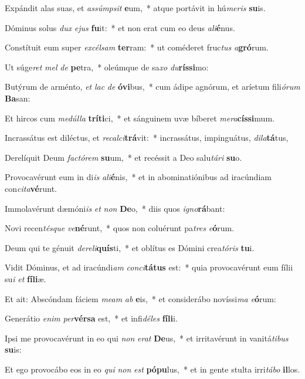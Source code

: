 \item Expándit alas suas, et \textit{as}\textit{súmp}\textit{sit} \textbf{e}um,~* atque portávit in hú\textit{me}\textit{ris} \textbf{su}is.
\item Dóminus solus \textit{dux} \textit{e}\textit{jus} \textbf{fu}it:~* et non erat cum eo deus \textit{a}\textit{li}\textbf{é}nus.
\item Constítuit eum super \textit{ex}\textit{cél}\textit{sam} \textbf{ter}ram:~* ut coméderet fruc\textit{tus} \textit{a}\textbf{gró}rum.
\item Ut súge\textit{ret} \textit{mel} \textit{de} \textbf{pe}tra,~* oleúmque de sa\textit{xo} \textit{du}\textbf{rís}\textbf{si}mo:
\item Butýrum de arménto, \textit{et} \textit{lac} \textit{de} \textbf{ó}\textbf{vi}bus,~* cum ádipe agnórum, et aríetum fili\textit{ó}\textit{rum} \textbf{Ba}san:
\item Et hircos cum \textit{me}\textit{dúl}\textit{la} \textbf{trí}\textbf{ti}ci,~* et sánguinem uvæ bíberet \textit{me}\textit{ra}\textbf{cís}\textbf{si}mum.
\item Incrassátus est diléctus, et \textit{re}\textit{cal}\textit{ci}\textbf{trá}vit:~* incrassátus, impinguátus, \textit{di}\textit{la}\textbf{tá}tus,
\item Derelíquit Deum \textit{fac}\textit{tó}\textit{rem} \textbf{su}um,~* et recéssit a Deo salu\textit{tá}\textit{ri} \textbf{su}o.
\item Provocavérunt eum in di\textit{is} \textit{a}\textit{li}\textbf{é}nis,~* et in abominatiónibus ad iracúndiam con\textit{ci}\textit{ta}\textbf{vé}runt.
\item Immolavérunt dæmóni\textit{is} \textit{et} \textit{non} \textbf{De}o,~* diis quos \textit{i}\textit{gno}\textbf{rá}bant:
\item Novi recen\textit{tés}\textit{que} \textit{ve}\textbf{né}runt,~* quos non coluérunt pa\textit{tres} \textit{e}\textbf{ó}rum.
\item Deum qui te génuit \textit{de}\textit{re}\textit{li}\textbf{quís}ti,~* et oblítus es Dómini crea\textit{tó}\textit{ris} \textbf{tu}i.
\item Vidit Dóminus, et ad iracúndi\textit{am} \textit{con}\textit{ci}\textbf{tá}\textbf{tus} est:~* quia provocavérunt eum fílii su\textit{i} \textit{et} \textbf{fí}\textbf{li}æ.
\item Et ait: Abscóndam fáciem \textit{me}\textit{am} \textit{ab} \textbf{e}is,~* et considerábo novíssi\textit{ma} \textit{e}\textbf{ó}rum:
\item Generátio \textit{e}\textit{nim} \textit{per}\textbf{vér}\textbf{sa} est,~* et infi\textit{dé}\textit{les} \textbf{fí}\textbf{li}i.
\item Ipsi me provocavérunt in eo qui \textit{non} \textit{e}\textit{rat} \textbf{De}us,~* et irritavérunt in vanitá\textit{ti}\textit{bus} \textbf{su}is:
\item Et ego provocábo eos in eo \textit{qui} \textit{non} \textit{est} \textbf{pó}\textbf{pu}lus,~* et in gente stulta irri\textit{tá}\textit{bo} \textbf{il}los.
